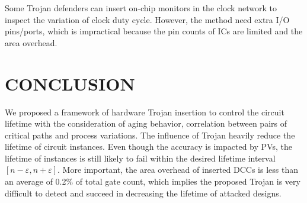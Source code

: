 Some Trojan defenders can insert on-chip monitors in the clock network to inspect the variation of clock duty cycle. However, the method need extra I/O pins/ports, which is impractical because the pin counts of ICs are limited and the area overhead.


\section{CONCLUSION}
We proposed a framework of hardware Trojan insertion to control the circuit lifetime with the consideration of aging behavior, correlation between pairs of critical paths and process variations. The influence of Trojan heavily reduce the lifetime of circuit instances. Even though the accuracy is impacted by PVs, the lifetime of instances is still likely to fail within the desired lifetime interval $[n - \varepsilon, n + \varepsilon]$. More important, the area overhead of inserted DCCs is less than an average of 0.2\% of total gate count, which implies the proposed Trojan is very difficult to detect and succeed in decreasing the lifetime of attacked designs.
